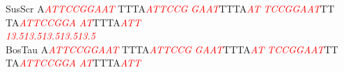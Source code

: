 \documentclass[11pt,twoside,reqno,a4paper]{article}
\begin{document}
{SusScr	A\textit{\textcolor{red}{A}}\textit{\textcolor{red}{T}}\textit{\textcolor{red}{T}}\textit{\textcolor{red}{C}}\textit{\textcolor{red}{C}}\textit{\textcolor{red}{G}}\textit{\textcolor{red}{G}}\textit{\textcolor{red}{A}}\textit{\textcolor{red}{A}}\textit{\textcolor{red}{T}}	TTTA\textit{\textcolor{red}{A}}\textit{\textcolor{red}{T}}\textit{\textcolor{red}{T}}\textit{\textcolor{red}{C}}\textit{\textcolor{red}{C}}\textit{\textcolor{red}{G}}	\textit{\textcolor{red}{G}}\textit{\textcolor{red}{A}}\textit{\textcolor{red}{A}}\textit{\textcolor{red}{T}}TTTA\textit{\textcolor{red}{A}}\textit{\textcolor{red}{T}}	\textit{\textcolor{red}{T}}\textit{\textcolor{red}{C}}\textit{\textcolor{red}{C}}\textit{\textcolor{red}{G}}\textit{\textcolor{red}{G}}\textit{\textcolor{red}{A}}\textit{\textcolor{red}{A}}\textit{\textcolor{red}{T}}TT	TA\textit{\textcolor{red}{A}}\textit{\textcolor{red}{T}}\textit{\textcolor{red}{T}}\textit{\textcolor{red}{C}}\textit{\textcolor{red}{C}}\textit{\textcolor{red}{G}}\textit{\textcolor{red}{G}}\textit{\textcolor{red}{A}}	\textit{\textcolor{red}{A}}\textit{\textcolor{red}{T}}TTTA\textit{\textcolor{red}{A}}\textit{\textcolor{red}{T}}\textit{\textcolor{red}{T}}\\
\hspace*{7\charwidth}\hspace*{1\charwidth}\textit{\textcolor{red}{13.5}}\hspace*{1\charwidth}\hspace*{10\charwidth}\textit{\textcolor{red}{13.5}}\hspace*{1\charwidth}\hspace*{10\charwidth}\textit{\textcolor{red}{13.5}}\hspace*{1\charwidth}\hspace*{1\charwidth}\hspace*{10\charwidth}\textit{\textcolor{red}{13.5}}\hspace*{1\charwidth}\hspace*{10\charwidth}\textit{\textcolor{red}{13.5}}\hspace*{1\charwidth}\\
BosTau	A\textit{\textcolor{red}{A}}\textit{\textcolor{red}{T}}\textit{\textcolor{red}{T}}\textit{\textcolor{red}{C}}\textit{\textcolor{red}{C}}\textit{\textcolor{red}{G}}\textit{\textcolor{red}{G}}\textit{\textcolor{red}{A}}\textit{\textcolor{red}{A}}\textit{\textcolor{red}{T}}	TTTA\textit{\textcolor{red}{A}}\textit{\textcolor{red}{T}}\textit{\textcolor{red}{T}}\textit{\textcolor{red}{C}}\textit{\textcolor{red}{C}}\textit{\textcolor{red}{G}}	\textit{\textcolor{red}{G}}\textit{\textcolor{red}{A}}\textit{\textcolor{red}{A}}\textit{\textcolor{red}{T}}TTTA\textit{\textcolor{red}{A}}\textit{\textcolor{red}{T}}	\textit{\textcolor{red}{T}}\textit{\textcolor{red}{C}}\textit{\textcolor{red}{C}}\textit{\textcolor{red}{G}}\textit{\textcolor{red}{G}}\textit{\textcolor{red}{A}}\textit{\textcolor{red}{A}}\textit{\textcolor{red}{T}}TT	TA\textit{\textcolor{red}{A}}\textit{\textcolor{red}{T}}\textit{\textcolor{red}{T}}\textit{\textcolor{red}{C}}\textit{\textcolor{red}{C}}\textit{\textcolor{red}{G}}\textit{\textcolor{red}{G}}\textit{\textcolor{red}{A}}	\textit{\textcolor{red}{A}}\textit{\textcolor{red}{T}}TTTA\textit{\textcolor{red}{A}}\textit{\textcolor{red}{T}}\textit{\textcolor{red}{T}}\\
}
\end{document}
